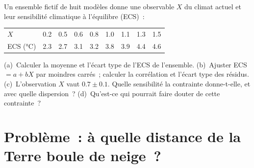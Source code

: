 \begin{exercise}[$\star\star\star$]\label{exo:b3:climate-models:12}
Un ensemble fictif de huit modèles donne une observable $X$ du
climat actuel et leur sensibilité climatique à l'équilibre (ECS)~:
\begin{center}
\begin{tabular}{l*{8}{c}}
\hline
$X$ & 0.2 & 0.5 & 0.6 & 0.8 & 1.0 & 1.1 & 1.3 & 1.5\\
ECS (\unit{\celsius}) & 2.3 & 2.7 & 3.1 & 3.2 & 3.8 & 3.9 & 4.4 & 4.6\\
\hline
\end{tabular}
\end{center}
(a)~Calculer la moyenne et l'écart type de l'ECS de
l'ensemble. (b)~Ajuster ECS $= a + bX$ par moindres carrés~; calculer la corrélation
et l'écart type des résidus. (c)~L'observation $X$ vaut $0.7
\pm 0.1$. Quelle sensibilité la contrainte donne-t-elle, et avec quelle dispersion~?
(d)~Qu'est-ce qui pourrait faire douter de cette contrainte~?
\end{exercise}

\section{Problème~: à quelle distance de la Terre boule de neige~?}

